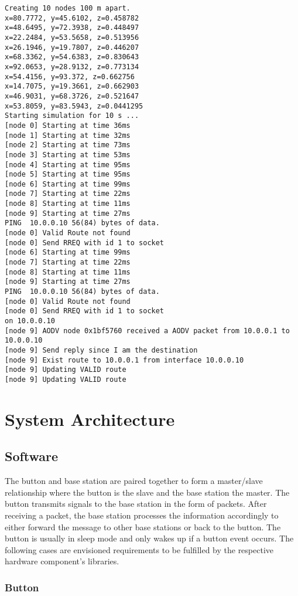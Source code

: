 \documentclass[journal]{IEEEtran}
\begin{document}
\begin{lstlisting}
Creating 10 nodes 100 m apart.
x=80.7772, y=45.6102, z=0.458782
x=48.6495, y=72.3938, z=0.448497
x=22.2484, y=53.5658, z=0.513956
x=26.1946, y=19.7807, z=0.446207
x=68.3362, y=54.6383, z=0.830643
x=92.0653, y=28.9132, z=0.773134
x=54.4156, y=93.372, z=0.662756
x=14.7075, y=19.3661, z=0.662903
x=46.9031, y=68.3726, z=0.521647
x=53.8059, y=83.5943, z=0.0441295
Starting simulation for 10 s ...
[node 0] Starting at time 36ms
[node 1] Starting at time 32ms
[node 2] Starting at time 73ms
[node 3] Starting at time 53ms
[node 4] Starting at time 95ms
[node 5] Starting at time 95ms
[node 6] Starting at time 99ms
[node 7] Starting at time 22ms
[node 8] Starting at time 11ms
[node 9] Starting at time 27ms
PING  10.0.0.10 56(84) bytes of data.
[node 0] Valid Route not found
[node 0] Send RREQ with id 1 to socket
[node 6] Starting at time 99ms
[node 7] Starting at time 22ms
[node 8] Starting at time 11ms
[node 9] Starting at time 27ms
PING  10.0.0.10 56(84) bytes of data.
[node 0] Valid Route not found
[node 0] Send RREQ with id 1 to socket
on 10.0.0.10
[node 9] AODV node 0x1bf5760 received a AODV packet from 10.0.0.1 to 10.0.0.10
[node 9] Send reply since I am the destination
[node 9] Exist route to 10.0.0.1 from interface 10.0.0.10
[node 9] Updating VALID route
[node 9] Updating VALID route
\end{lstlisting}

\section{System Architecture}

\subsection{Software}

The button and base station are paired together to form a master/slave relationship where the button is the slave and the base station the master.  The button transmits signals to the base station in the form of packets.  After receiving a packet, the base station processes the information accordingly to either forward the message to other base stations or back to the button.  The button is usually in sleep mode and only wakes up if a button event occurs.  The following cases are envisioned requirements to be fulfilled by the respective hardware component’s libraries.

\subsubsection{Button}
\end{document}

